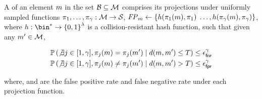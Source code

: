 \begin{definition}
	A \projectionPrimitive of an element $\genericMetricSpaceElmt$ in the set $\blocklist \subseteq \metricSpace$ 
	comprises its projections under uniformly sampled functions $\projFn[1], 
	\dots, \projFn[\numProjections]: \metricSpace \rightarrow \projectedSpace$, $\fingerprint{\genericMetricSpaceElmt} \assign 
	\{\hashFn(\projFn[1](\genericMetricSpaceElmt), \projFn[1])$ $\dots, \hashFn(\projFn[\numProjections](\genericMetricSpaceElmt), \projFn[\numProjections])\}$, where $\hashFn: \bin^{\ast} \rightarrow \setDefn{0,1}^{\secParam}$ is a collision-resistant hash function, such that given any 
$\genericMetricSpaceElmtAlt \in \metricSpace$,
		
		\begin{small}
		\begin{align}
			& \cprob{}{\not\exists \projIdx \in \nats[1][\numProjections], 
				\projFn[\projIdx](\genericMetricSpaceElmt) = \projFn[\projIdx](\genericMetricSpaceElmtAlt)}{\distanceNotation[\distance][\genericMetricSpaceElmt][\genericMetricSpaceElmtAlt] \le 
			\threshold} \le \fnr^{\numProjections} \label{eq:no_false_neg} \\
			& \cprob{}{\not\exists \projIdx \in \nats[1][\numProjections], 
				\projFn[\projIdx](\genericMetricSpaceElmt) \neq \projFn[\projIdx](\genericMetricSpaceElmtAlt)}{\distanceNotation[\distance][\genericMetricSpaceElmt][\genericMetricSpaceElmtAlt] > 
			\threshold} \le \fpr^{\numProjections} \label{eq:no_false_pos}
		\end{align}
		\end{small}
where,  \fpr and \fnr are the false positive rate and false negative rate under each projection function. 
		

		

\end{definition}

